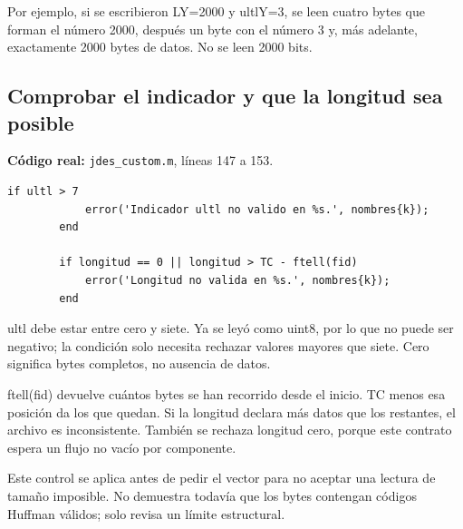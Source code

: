 \documentclass[11pt,a4paper,oneside]{report}
\begin{document}
Por ejemplo, si se escribieron LY=2000 y ultlY=3, se leen cuatro bytes que
forman el número 2000, después un byte con el número 3 y, más adelante,
exactamente 2000 bytes de datos. No se leen 2000 bits.


\par\medskip\noindent\begin{minipage}{\linewidth}

\subsection{Comprobar el indicador y que la longitud sea posible}

\textbf{Código real:} \texttt{jdes\_custom.m}, líneas 147 a 153.

\begin{lstlisting}[firstnumber=147]
        if ultl > 7
            error('Indicador ultl no valido en %s.', nombres{k});
        end

        if longitud == 0 || longitud > TC - ftell(fid)
            error('Longitud no valida en %s.', nombres{k});
        end
\end{lstlisting}

\end{minipage}\par


ultl debe estar entre cero y siete. Ya se leyó como uint8, por lo que no
puede ser negativo; la condición solo necesita rechazar valores mayores que siete.
Cero significa bytes completos, no ausencia de datos.

ftell(fid) devuelve cuántos bytes se han recorrido desde el inicio. TC menos
esa posición da los que quedan. Si la longitud declara más datos que los
restantes, el archivo es inconsistente. También se rechaza longitud cero,
porque este contrato espera un flujo no vacío por componente.

Este control se aplica antes de pedir el vector para no aceptar una lectura
de tamaño imposible. No demuestra todavía que los bytes contengan códigos
Huffman válidos; solo revisa un límite estructural.
\end{document}
